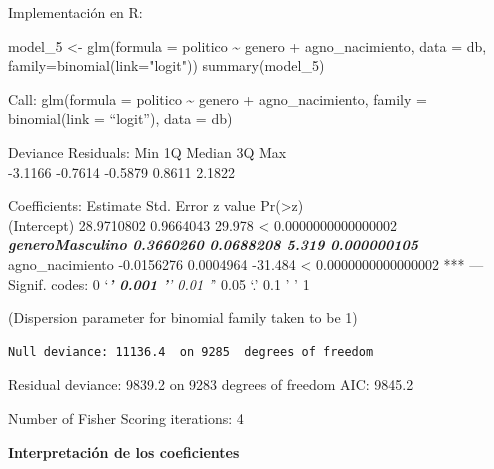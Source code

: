 \documentclass[
  12pt,
  a4paper,
]{article}
\newenvironment{Shaded}{\begin{snugshade}}{\end{snugshade}}
\newcommand{\AttributeTok}[1]{\textcolor[rgb]{0.77,0.63,0.00}{#1}}
\newcommand{\FunctionTok}[1]{\textcolor[rgb]{0.00,0.00,0.00}{#1}}
\newcommand{\NormalTok}[1]{#1}
\newcommand{\OtherTok}[1]{\textcolor[rgb]{0.56,0.35,0.01}{#1}}
\newcommand{\SpecialCharTok}[1]{\textcolor[rgb]{0.00,0.00,0.00}{#1}}
\newcommand{\StringTok}[1]{\textcolor[rgb]{0.31,0.60,0.02}{#1}}
\begin{document}
Implementación en R:

\begin{Shaded}
\begin{Highlighting}[]
\NormalTok{model\_5 }\OtherTok{\textless{}{-}} \FunctionTok{glm}\NormalTok{(}\AttributeTok{formula =}\NormalTok{ politico }\SpecialCharTok{\textasciitilde{}}\NormalTok{ genero }\SpecialCharTok{+}\NormalTok{ agno\_nacimiento, }
               \AttributeTok{data =}\NormalTok{ db, }\AttributeTok{family=}\FunctionTok{binomial}\NormalTok{(}\AttributeTok{link=}\StringTok{"logit"}\NormalTok{))}
\FunctionTok{summary}\NormalTok{(model\_5)}
\end{Highlighting}
\end{Shaded}

Call:
glm(formula = politico \textasciitilde{} genero + agno\_nacimiento, family = binomial(link = ``logit''),
data = db)

Deviance Residuals:
Min 1Q Median 3Q Max\\
-3.1166 -0.7614 -0.5879 0.8611 2.1822

Coefficients:
Estimate Std. Error z value Pr(\textgreater\textbar z\textbar)\\
(Intercept) 28.9710802 0.9664043 29.978 \textless{} 0.0000000000000002 \textbf{\emph{
generoMasculino 0.3660260 0.0688208 5.319 0.000000105 }}
agno\_nacimiento -0.0156276 0.0004964 -31.484 \textless{} 0.0000000000000002 ***
---
Signif. codes: 0 `\emph{\textbf{' 0.001 '}' 0.01 '}' 0.05 `.' 0.1 ' ' 1

(Dispersion parameter for binomial family taken to be 1)

\begin{verbatim}
Null deviance: 11136.4  on 9285  degrees of freedom
\end{verbatim}

Residual deviance: 9839.2 on 9283 degrees of freedom
AIC: 9845.2

Number of Fisher Scoring iterations: 4

\textbf{Interpretación de los coeficientes}
\end{document}

